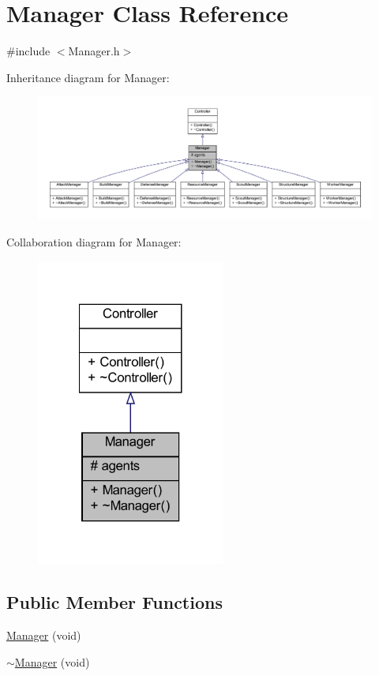 \hypertarget{classManager}{\section{Manager Class Reference}
\label{classManager}
}


{\ttfamily \#include $<$Manager.\-h$>$}



Inheritance diagram for Manager\-:
\nopagebreak
\begin{figure}[H]
\begin{center}
\leavevmode
\includegraphics[width=350pt]{classManager__inherit__graph}
\end{center}
\end{figure}


Collaboration diagram for Manager\-:
\nopagebreak
\begin{figure}[H]
\begin{center}
\leavevmode
\includegraphics[width=176pt]{classManager__coll__graph}
\end{center}
\end{figure}
\subsection*{Public Member Functions}
\begin{DoxyCompactItemize}
\item 
\hyperlink{classManager_a7be059e5cec8f04ce985bd01fba9a1b9}{Manager} (void)
\item 
\hyperlink{classManager_a290325723ed4a28950604ff228ef19cd}{$\sim$\-Manager} (void)
\end{DoxyCompactItemize}

